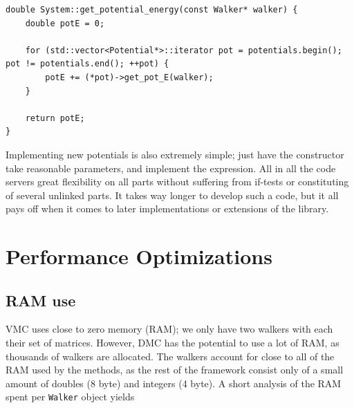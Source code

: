 \vspace{0.5cm}
\begin{lstlisting}
double System::get_potential_energy(const Walker* walker) {
    double potE = 0;

    for (std::vector<Potential*>::iterator pot = potentials.begin(); pot != potentials.end(); ++pot) {
        potE += (*pot)->get_pot_E(walker);
    }

    return potE;
}
\end{lstlisting}

Implementing new potentials is also extremely simple; just have the constructor take reasonable parameters, and implement the expression. All in all the code servers great flexibility on all parts without suffering from if-tests or constituting of several unlinked parts. It takes way longer to develop such a code, but it all pays off when it comes to later implementations or extensions of the library.

\section{Performance Optimizations}

\subsection{RAM use}

VMC uses close to zero memory (RAM); we only have two walkers with each their set of matrices. However, DMC has the potential to use a lot of RAM, as thousands of walkers are allocated. The walkers account for close to all of the RAM used by the methods, as the rest of the framework consist only of a small amount of doubles (8 byte) and integers (4 byte). A short analysis of the RAM spent per \verb+Walker+ object yields

